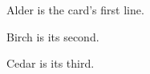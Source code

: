\documentclass{card}
\begin{document}
\begin{frame}
Alder is the card's first line.

Birch is its second.

Cedar is its third.
\end{frame}
\end{document}
